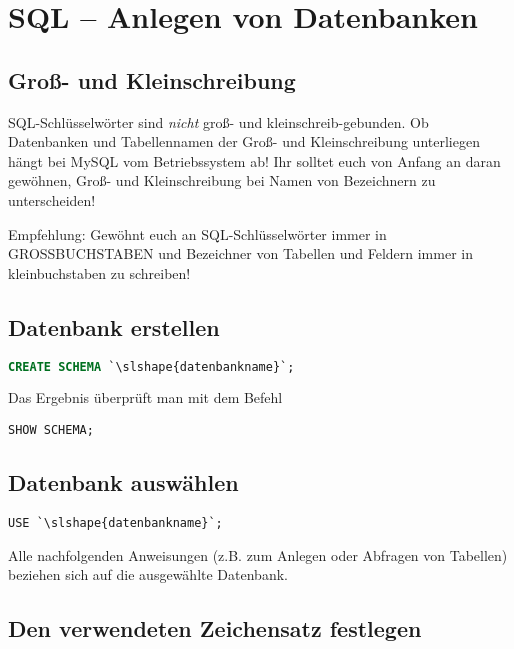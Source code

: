 \lstset{style=mySQL}

\section{SQL -- Anlegen von Datenbanken}

\subsection{Groß- und Kleinschreibung}

SQL-Schlüsselwörter sind \textit{nicht} groß- und kleinschreib-gebunden. Ob
Datenbanken und Tabellennamen der Groß- und Kleinschreibung unterliegen hängt
bei MySQL vom Betriebssystem ab! Ihr solltet euch von Anfang an daran gewöhnen,
Groß- und Kleinschreibung bei Namen von Bezeichnern zu unterscheiden!

Empfehlung: Gewöhnt euch an SQL-Schlüsselwörter immer in GROSSBUCHSTABEN und
Bezeichner von Tabellen und Feldern immer in kleinbuchstaben zu schreiben!


\subsection{Datenbank erstellen}

\begin{lstlisting}[language=SQL]
CREATE SCHEMA `\slshape{datenbankname}`;
\end{lstlisting}

Das Ergebnis überprüft man mit dem Befehl

\begin{lstlisting}
SHOW SCHEMA;
\end{lstlisting}


\subsection{Datenbank auswählen}

\begin{lstlisting}
USE `\slshape{datenbankname}`;
\end{lstlisting}

Alle nachfolgenden Anweisungen (z.B. zum Anlegen oder Abfragen von Tabellen)
beziehen sich auf die ausgewählte Datenbank.


\subsection{Den verwendeten Zeichensatz festlegen}

